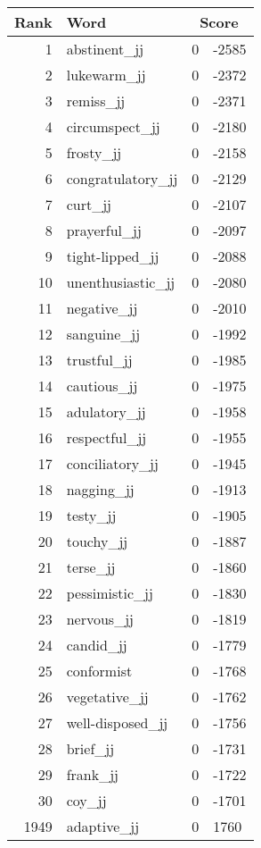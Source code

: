 \begin{longtable}[!htbp]{| rlr@{.}l |}
    \hline
    \textbf{Rank} & \textbf{Word} & \multicolumn{2}{c|}{\textbf{Score}} \\
    \hline
    \endhead
    1 & abstinent\_jj & 0 & -2585 \\
    2 & lukewarm\_jj & 0 & -2372 \\
    3 & remiss\_jj & 0 & -2371 \\
    4 & circumspect\_jj & 0 & -2180 \\
    5 & frosty\_jj & 0 & -2158 \\
    6 & congratulatory\_jj & 0 & -2129 \\
    7 & curt\_jj & 0 & -2107 \\
    8 & prayerful\_jj & 0 & -2097 \\
    9 & tight-lipped\_jj & 0 & -2088 \\
    10 & unenthusiastic\_jj & 0 & -2080 \\
    11 & negative\_jj & 0 & -2010 \\
    12 & sanguine\_jj & 0 & -1992 \\
    13 & trustful\_jj & 0 & -1985 \\
    14 & cautious\_jj & 0 & -1975 \\
    15 & adulatory\_jj & 0 & -1958 \\
    16 & respectful\_jj & 0 & -1955 \\
    17 & conciliatory\_jj & 0 & -1945 \\
    18 & nagging\_jj & 0 & -1913 \\
    19 & testy\_jj & 0 & -1905 \\
    20 & touchy\_jj & 0 & -1887 \\
    21 & terse\_jj & 0 & -1860 \\
    22 & pessimistic\_jj & 0 & -1830 \\
    23 & nervous\_jj & 0 & -1819 \\
    24 & candid\_jj & 0 & -1779 \\
    25 & conformist & 0 & -1768 \\
    26 & vegetative\_jj & 0 & -1762 \\
    27 & well-disposed\_jj & 0 & -1756 \\
    28 & brief\_jj & 0 & -1731 \\
    29 & frank\_jj & 0 & -1722 \\
    30 & coy\_jj & 0 & -1701 \\
    1949 & adaptive\_jj & 0 & 1760 \\

\end{longtable}

